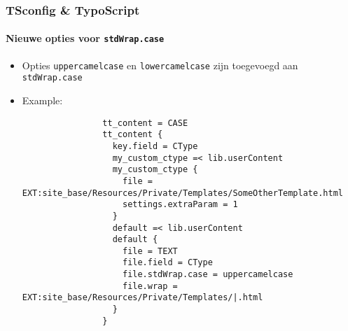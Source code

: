 \begin{frame}[fragile]
	\frametitle{TSconfig \& TypoScript}
	\framesubtitle{Nieuwe opties voor \texttt{stdWrap.case}}

	\lstset{basicstyle=\tiny\ttfamily}

	\begin{itemize}

		\item Opties \texttt{uppercamelcase} en \texttt{lowercamelcase} zijn toegevoegd aan
			\texttt{stdWrap.case}

		\item Example:

			\begin{lstlisting}
				tt_content = CASE
				tt_content {
				  key.field = CType
				  my_custom_ctype =< lib.userContent
				  my_custom_ctype {
				    file = EXT:site_base/Resources/Private/Templates/SomeOtherTemplate.html
				    settings.extraParam = 1
				  }
				  default =< lib.userContent
				  default {
				    file = TEXT
				    file.field = CType
				    file.stdWrap.case = uppercamelcase
				    file.wrap = EXT:site_base/Resources/Private/Templates/|.html
				  }
				}
			\end{lstlisting}

	\end{itemize}

\end{frame}


